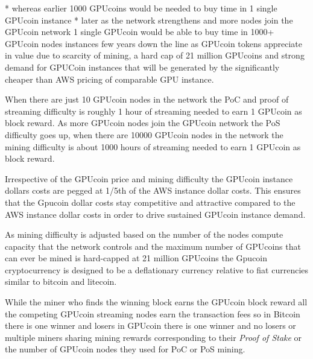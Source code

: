* whereas earlier 1000 GPUcoins would be needed to buy time in 1 single GPUcoin instance
* later as the network strengthens and more nodes join the GPUcoin network 1 single GPUcoin would be able to buy time in 1000+ GPUcoin nodes instances few years down the line as GPUcoin tokens appreciate in value due to scarcity of mining, a hard cap of 21 million GPUcoins and strong demand for GPUCoin instances that will be generated by the significantly cheaper than AWS pricing of comparable GPU instance.

When there are just 10 GPUcoin nodes in the network the PoC and proof of streaming difficulty is roughly 1 hour of streaming needed to earn 1 GPUcoin as block reward. As more GPUcoin nodes join the GPUcoin network the PoS difficulty goes up, when there are 10000 GPUcoin nodes in the network the mining difficulty is about 1000 hours of streaming needed to earn 1 GPUcoin as block reward.

Irrespective of the GPUcoin price and mining difficulty the GPUcoin instance dollars costs are pegged at 1/5th of the AWS instance dollar costs. This ensures that the Gpucoin dollar costs stay competitive and attractive compared to the AWS instance dollar costs in order to drive sustained GPUcoin instance demand.

As mining difficulty is adjusted based on the number of the nodes compute capacity that the network controls and the maximum number of GPUcoins that can ever be mined is hard-capped at 21 million GPUcoins the Gpucoin cryptocurrency is designed to be a deflationary currency relative to fiat currencies similar to bitcoin and litecoin.

While the miner who finds the winning block earns the GPUcoin block reward all the competing GPUcoin streaming nodes earn the transaction fees so in Bitcoin there is one winner and losers in GPUcoin there is one winner and no losers or multiple miners sharing mining rewards corresponding to their \emph{Proof of Stake} or the number of GPUcoin nodes they used for PoC or PoS mining.
